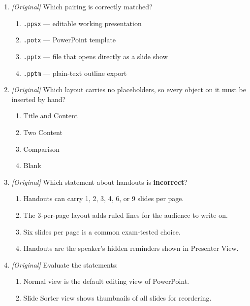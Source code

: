 \begin{enumerate}[label=\textbf{Q\arabic*.}, leftmargin=*]
  \begin{enumerate}[label=\Alph*.]
    \item animation; transition
    \item transition; animation
    \item layout; theme
    \item master; handout
  \end{enumerate}
\item \textit{[Original]} Which pairing is correctly matched?
  \begin{enumerate}[label=\Alph*.]
    \item \texttt{.ppsx} --- editable working presentation
    \item \texttt{.potx} --- PowerPoint template
    \item \texttt{.pptx} --- file that opens directly as a slide show
    \item \texttt{.pptm} --- plain-text outline export
  \end{enumerate}
\item \textit{[Original]} Which layout carries no placeholders, so every
  object on it must be inserted by hand?
  \begin{enumerate}[label=\Alph*.]
    \item Title and Content
    \item Two Content
    \item Comparison
    \item Blank
  \end{enumerate}
\item \textit{[Original]} Which statement about handouts is
  \textbf{incorrect}?
  \begin{enumerate}[label=\Alph*.]
    \item Handouts can carry 1, 2, 3, 4, 6, or 9 slides per page.
    \item The 3-per-page layout adds ruled lines for the audience to write on.
    \item Six slides per page is a common exam-tested choice.
    \item Handouts are the speaker's hidden reminders shown in Presenter View.
  \end{enumerate}
\item \textit{[Original]} Evaluate the statements:
  \begin{enumerate}[label=\Roman*.]
    \item Normal view is the default editing view of PowerPoint.
    \item Slide Sorter view shows thumbnails of all slides for reordering.

\end{enumerate}
\end{enumerate}
